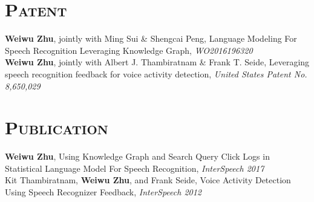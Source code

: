 \begin{resume}



\section{\textsc{Patent}}
\textbf{Weiwu Zhu}, jointly with Ming Sui \& Shengcai Peng, Language Modeling For Speech Recognition Leveraging Knowledge Graph, {\it WO2016196320}\\
\vspace*{-4pt}
\newline
\textbf{Weiwu Zhu}, jointly with Albert J. Thambiratnam \& Frank T. Seide, Leveraging speech recognition feedback for voice activity detection, {\it United States Patent No. 8,650,029}\\

\vspace*{-8pt}
\section{\textsc{Publication}}
\textbf{Weiwu Zhu}, Using Knowledge Graph and Search Query Click Logs in Statistical Language Model For Speech Recognition, {\it InterSpeech 2017}\\
\vspace*{-6pt}
\newline
Kit Thambiratnam, \textbf{Weiwu Zhu}, and Frank Seide, Voice Activity Detection Using Speech Recognizer Feedback, {\it InterSpeech 2012}\\





\end{resume}
